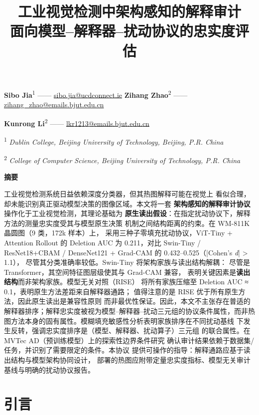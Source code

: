 \documentclass[11pt,a4paper]{article}
\title{工业视觉检测中架构感知的解释审计\\
\large 面向模型--解释器--扰动协议的忠实度评估}
\author{}
\date{}
\begin{document}
\maketitle
\thispagestyle{empty}

\textbf{Sibo Jia}\textsuperscript{1} ------ \href{mailto:sibo.jia@ucdconnect.ie}{sibo.jia@ucdconnect.ie} \textbf{Zihang Zhao}\textsuperscript{2} ------ \href{mailto:zihang_zhao@emails.bjut.edu.cn}{zihang\_zhao@emails.bjut.edu.cn}

\textbf{Kunrong Li}\textsuperscript{2} ------ \href{mailto:lkr1213@emails.bjut.edu.cn}{lkr1213@emails.bjut.edu.cn}

\textsuperscript{1} \emph{Dublin College, Beijing University of Technology, Beijing, P.R. China}

\textsuperscript{2} \emph{College of Computer Science, Beijing University of Technology, P.R. China}
\begin{center}
\textbf{摘要}
\end{center}

工业视觉检测系统日益依赖深度分类器，但其热图解释可能在视觉上 看似合理，却未能识别真正驱动模型决策的图像区域。本文将一套 \textbf{架构感知的解释审计协议}操作化于工业视觉检测，其理论基础为 \textbf{原生读出假设}：在指定扰动协议下，解释方法的测量忠实度受其与模型原生决策 机制之间结构距离的约束。在 WM-811K 晶圆图（9 类，172k 样本）上， 采用三种子零填充扰动协议，ViT-Tiny + Attention Rollout 的 Deletion AUC 为 0.211，对比 Swin-Tiny / ResNet18+CBAM / DenseNet121 + Grad-CAM 的 0.432–0.525（|Cohen’s \emph{d}| > 1.1）， 尽管其分类准确率较低。Swin-Tiny 将架构家族与读出结构解耦： 尽管是 Transformer，其空间特征图层级使其与 Grad-CAM 兼容， 表明关键因素是\textbf{读出结构}而非架构家族。模型无关对照（RISE） 将所有家族压缩至 Deletion AUC ≈ 0.1，表明原生方法差距来自解释器通路； 值得注意的是 RISE 优于所有原生方法，因此原生读出是兼容性原则 而非最优性保证。因此，本文不主张存在普适的解释器排序；解释忠实度被视为模型–解释器–扰动三元组的协议条件属性，而非热图方法本身的固有属性。模糊填充敏感性分析表明家族排序在不同扰动基线 下发生反转，强调忠实度排序是（模型、解释器、扰动算子）三元组 的联合属性。在 MVTec AD（预训练模型）上的探索性边界条件研究 确认审计结果依赖于数据集/任务，并识别了需要限定的条件。本协议 提供可操作的指导：解释通路应基于读出结构与模型架构协同设计， 部署的热图应附带定量忠实度指标、模型无关审计基线与明确的扰动协议报告。

\section{引言}
\end{document}
